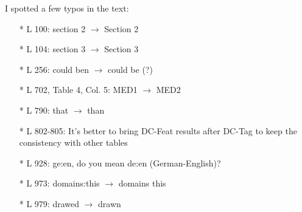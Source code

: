 \documentclass[12pt,times,a4paper,twoside]{article}
\begin{document}
I spotted a few typos in the text:
\begin{itemize}
\item[*] L 100: section 2 $\rightarrow$ Section 2
\item[*] L 104: section 3 $\rightarrow$ Section 3
\item[*] L 256: could ben $\rightarrow$ could be (?)
\item[*] L 702, Table 4, Col. 5: MED1 $\rightarrow$ MED2
\item[*] L 790: that $\rightarrow$ than
\item[*] L 802-805: It’s better to bring DC-Feat results after DC-Tag to keep the consistency with other tables
\item[*] L 928: ge:en, do you mean de:en (German-English)?
\item[*] L 973: domains:this $\rightarrow$ domains this
\item[*] L 979: drawed $\rightarrow$ drawn
\end{itemize}
\end{document}

